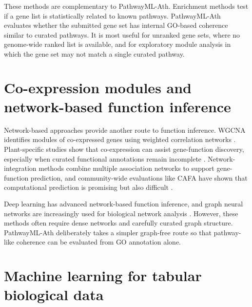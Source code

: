 \documentclass[12pt,letterpaper,oneside,openany]{book}
\begin{document}
These methods are complementary to PathwayML-Ath. Enrichment methods test if a gene list is statistically related to known pathways. PathwayML-Ath evaluates whether the submitted gene set has internal GO-based coherence similar to curated pathways. It is most useful for unranked gene sets, where no genome-wide ranked list is available, and for exploratory module analysis in which the gene set may not match a single curated pathway.

\section{Co-expression modules and network-based function inference}
\label{sec:lit_networks}

Network-based approaches provide another route to function inference. WGCNA identifies modules of co-expressed genes using weighted correlation networks \citep{langfelder2008wgcna}. Plant-specific studies show that co-expression can assist gene-function discovery, especially when curated functional annotations remain incomplete \citep{obayashi2018atted,usadel2009coexpression,liesecke2018ranking}. Network-integration methods combine multiple association networks to support gene-function prediction, and community-wide evaluations like CAFA have shown that computational prediction is promising but also difficult \citep{radivojac2013community}.

Deep learning has advanced network-based function inference, and graph neural networks are increasingly used for biological network analysis \citep{muzio2021biological}. However, these methods often require dense networks and carefully curated graph structure. PathwayML-Ath deliberately takes a simpler graph-free route so that pathway-like coherence can be evaluated from GO annotation alone.

\section{Machine learning for tabular biological data}
\label{sec:lit_ml_tabular}
\end{document}
